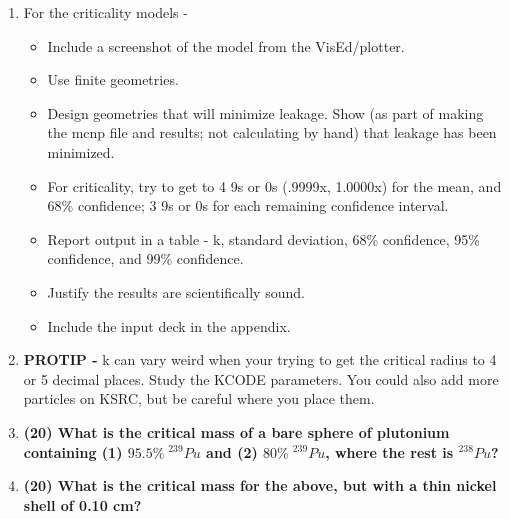 \documentclass[11pt,a4paper]{article}
\begin{document}
\begin{enumerate}[leftmargin=*,topsep=0pt,font=\bfseries]
        \newpage 
    \item[] For the criticality models - 
        \begin{itemize}[leftmargin=*,topsep=0pt]
            \item Include a screenshot of the model from the VisEd/plotter.
            \item Use finite geometries.
            \item Design geometries that will minimize leakage. Show (as part of making the mcnp file and results; not calculating by hand) that leakage has been minimized.
            \item For criticality, try to get to 4 9s or 0s (.9999x, 1.0000x) for the mean, and 68\% confidence; 3 9s or 0s for each remaining confidence interval.
            \item Report output in a table - k, standard deviation, 68\% confidence, 95\% confidence, and 99\% confidence.
            \item Justify the results are scientifically sound.
            \item Include the input deck in the appendix.
        \end{itemize}
    \item[]\textbf{PROTIP - }k can vary weird when your trying to get the critical radius to 4 or 5 decimal places. Study the KCODE parameters. You could also add more particles on KSRC, but be careful where you place them.
        \newpage
    \item\textbf{(20) What is the critical mass of a bare sphere of plutonium containing (1) $95.5\% \; ^{239}Pu$ and (2) $80\% \; ^{239}Pu$, where the rest is $^{238}Pu$?}
        \vspace{0.25in}\\




















        \newpage 
    \item\textbf{(20) What is the critical mass for the above, but with a thin nickel shell of 0.10 cm?}
        \vspace{0.25in}\\

















\end{enumerate}
\end{document}
